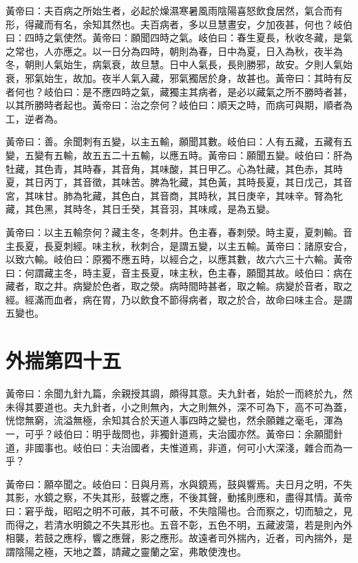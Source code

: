 黃帝曰：夫百病之所始生者，必起於燥濕寒暑風雨陰陽喜怒飲食居然，氣合而有形，得藏而有名，余知其然也。夫百病者，多以旦慧晝安，夕加夜甚，何也？岐伯曰：四時之氣使然。黃帝曰：願聞四時之氣。岐伯曰：春生夏長，秋收冬藏，是氣之常也，人亦應之。以一日分為四時，朝則為春，日中為夏，日入為秋，夜半為冬，朝則人氣始生，病氣衰，故旦慧。日中人氣長，長則勝邪，故安。夕則人氣始衰，邪氣始生，故加。夜半人氣入藏，邪氣獨居於身，故甚也。黃帝曰：其時有反者何也？岐伯曰：是不應四時之氣，藏獨主其病者，是必以藏氣之所不勝時者甚，以其所勝時者起也。黃帝曰：治之奈何？岐伯曰：順天之時，而病可與期，順者為工，逆者為。

黃帝曰：善。余聞刺有五變，以主五輸，願聞其數。岐伯曰：人有五藏，五藏有五變，五變有五輸，故五五二十五輸，以應五時。黃帝曰：願聞五變。岐伯曰：肝為牡藏，其色青，其時春，其音角，其味酸，其日甲乙。心為牡藏，其色赤，其時夏，其日丙丁，其音徵，其味苦。脾為牝藏，其色黃，其時長夏，其日戊己，其音宮，其味甘。肺為牝藏，其色白，其音商，其時秋，其日庚辛，其味辛。腎為牝藏，其色黑，其時冬，其日壬癸，其音羽，其味咸，是為五變。

黃帝曰：以主五輸奈何？藏主冬，冬刺井。色主春，春刺滎。時主夏，夏刺輸。音主長夏，長夏刺經。味主秋，秋刺合，是謂五變，以主五輸。黃帝曰：諸原安合，以致六輸。岐伯曰：原獨不應五時，以經合之，以應其數，故六六三十六輸。黃帝曰：何謂藏主冬，時主夏，音主長夏，味主秋，色主春，願聞其故。岐伯曰：病在藏者，取之井。病變於色者，取之滎。病時間時甚者，取之輸。病變於音者，取之經。經滿而血者，病在胃，乃以飲食不節得病者，取之於合，故命曰味主合。是謂五變也。



\section{外揣第四十五}

黃帝曰：余聞九針九篇，余親授其調，頗得其意。夫九針者，始於一而終於九，然未得其要道也。夫九針者，小之則無內，大之則無外，深不可為下，高不可為蓋，恍惚無窮，流溢無極，余知其合於天道人事四時之變也，然余願雜之毫毛，渾為一，可乎？岐伯曰：明乎哉問也，非獨針道焉，夫治國亦然。黃帝曰：余願聞針道，非國事也。岐伯曰：夫治國者，夫惟道焉，非道，何可小大深淺，雜合而為一乎？

黃帝曰：願卒聞之。岐伯曰：日與月焉，水與鏡焉，鼓與響焉。夫日月之明，不失其影，水鏡之察，不失其形，鼓響之應，不後其聲，動搖則應和，盡得其情。黃帝曰：窘乎哉，昭昭之明不可蔽，其不可蔽，不失陰陽也。合而察之，切而驗之，見而得之，若清水明鏡之不失其形也。五音不彰，五色不明，五藏波蕩，若是則內外相襲，若鼓之應桴，響之應聲，影之應形。故遠者司外揣內，近者，司內揣外，是謂陰陽之極，天地之蓋，請藏之靈蘭之室，弗敢使洩也。


